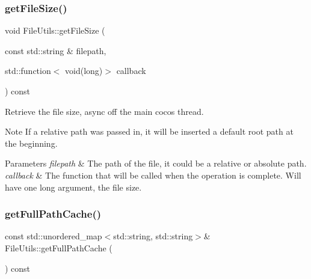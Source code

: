 \mbox{\label{classFileUtils_a20603b766e16b04ef5d50f95bc5629a9}} 
\subsubsection{\texorpdfstring{get\+File\+Size()}{getFileSize()}\hspace{0.1cm}{\footnotesize\ttfamily [3/3]}}
{\footnotesize\ttfamily void File\+Utils\+::get\+File\+Size (\begin{DoxyParamCaption}\item[{const std\+::string \&}]{filepath,  }\item[{std\+::function$<$ void(long)$>$}]{callback }\end{DoxyParamCaption}) const\hspace{0.3cm}{\ttfamily [virtual]}}

Retrieve the file size, async off the main cocos thread.

\begin{DoxyNote}{Note}
If a relative path was passed in, it will be inserted a default root path at the beginning. 
\end{DoxyNote}

\begin{DoxyParams}{Parameters}
{\em filepath} & The path of the file, it could be a relative or absolute path. \\
\hline
{\em callback} & The function that will be called when the operation is complete. Will have one long argument, the file size. \\
\hline
\end{DoxyParams}
\mbox{\label{classFileUtils_a79f4f099ea02d95e5d90425f038fb9d3}} 
\subsubsection{\texorpdfstring{get\+Full\+Path\+Cache()}{getFullPathCache()}\hspace{0.1cm}{\footnotesize\ttfamily [1/2]}}
{\footnotesize\ttfamily const std\+::unordered\+\_\+map$<$std\+::string, std\+::string$>$\& File\+Utils\+::get\+Full\+Path\+Cache (\begin{DoxyParamCaption}{ }\end{DoxyParamCaption}) const\hspace{0.3cm}{\ttfamily [inline]}}

